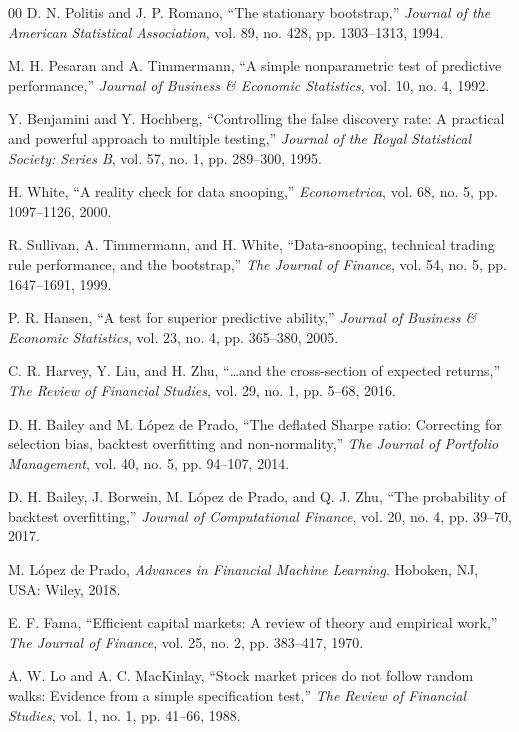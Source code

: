 \documentclass[conference]{IEEEtran}
\begin{document}
\begin{thebibliography}{00}
 D. N. Politis and J. P. Romano, ``The stationary
bootstrap,'' \emph{Journal of the American Statistical Association}, vol. 89,
no. 428, pp. 1303--1313, 1994.

 M. H. Pesaran and A. Timmermann, ``A simple nonparametric test
of predictive performance,'' \emph{Journal of Business \& Economic Statistics},
vol. 10, no. 4, 1992.

 Y. Benjamini and Y. Hochberg, ``Controlling the false discovery
rate: A practical and powerful approach to multiple testing,'' \emph{Journal of
the Royal Statistical Society: Series B}, vol. 57, no. 1, pp. 289--300, 1995.

 H. White, ``A reality check for data snooping,''
\emph{Econometrica}, vol. 68, no. 5, pp. 1097--1126, 2000.

 R. Sullivan, A. Timmermann, and H. White,
``Data-snooping, technical trading rule performance, and the bootstrap,''
\emph{The Journal of Finance}, vol. 54, no. 5, pp. 1647--1691, 1999.

 P. R. Hansen, ``A test for superior predictive ability,''
\emph{Journal of Business \& Economic Statistics}, vol. 23, no. 4,
pp. 365--380, 2005.

 C. R. Harvey, Y. Liu, and H. Zhu, ``\ldots and the
cross-section of expected returns,'' \emph{The Review of Financial Studies},
vol. 29, no. 1, pp. 5--68, 2016.

 D. H. Bailey and M. L\'opez de Prado, ``The deflated Sharpe
ratio: Correcting for selection bias, backtest overfitting and non-normality,''
\emph{The Journal of Portfolio Management}, vol. 40, no. 5, pp. 94--107, 2014.

 D. H. Bailey, J. Borwein, M. L\'opez de Prado, and
Q. J. Zhu, ``The probability of backtest overfitting,'' \emph{Journal of
Computational Finance}, vol. 20, no. 4, pp. 39--70, 2017.

 M. L\'opez de Prado, \emph{Advances in Financial Machine
Learning}. Hoboken, NJ, USA: Wiley, 2018.

 E. F. Fama, ``Efficient capital markets: A review of theory
and empirical work,'' \emph{The Journal of Finance}, vol. 25, no. 2,
pp. 383--417, 1970.

 A. W. Lo and A. C. MacKinlay, ``Stock market prices do not
follow random walks: Evidence from a simple specification test,'' \emph{The
Review of Financial Studies}, vol. 1, no. 1, pp. 41--66, 1988.


\end{thebibliography}
\end{document}
